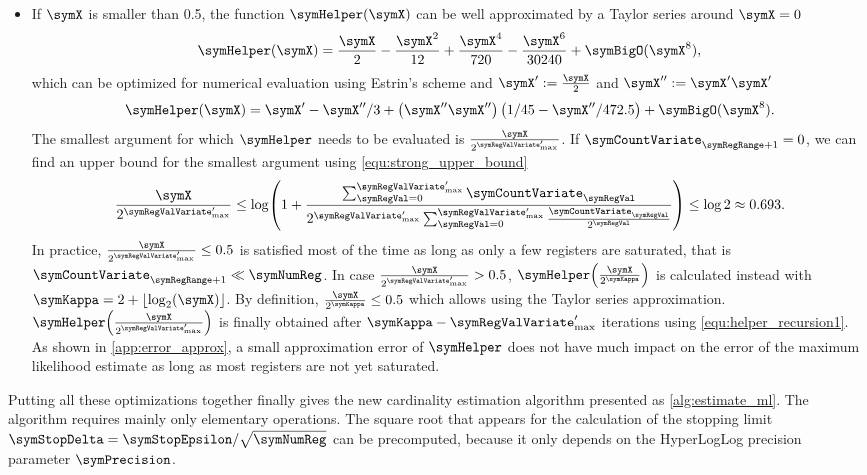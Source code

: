\documentclass[a4paper]{scrartcl}
\begin{document}
\begin{itemize}
\item If $\symX$ is smaller than 0.5, the function $\symHelper(\symX)$ can be well approximated by a Taylor series around $\symX=0$
\begin{equation}
\symHelper(\symX)
=
\frac{\symX}{2} - \frac{\symX^2}{12} +\frac{\symX^4}{720}-\frac{\symX^6}{30240} + \symBigO(\symX^{8}),
\end{equation}
which can be optimized for numerical evaluation using Estrin's scheme and $\symX' := \frac{\symX}{2}$ and $\symX'' := \symX' \symX'$
\begin{equation}
\label{equ:taylor}
\symHelper(\symX)
=
\symX' - \symX''/3 + \left(\symX'' \symX''\right)\left(1/45-\symX''/472.5\right)
+ \symBigO(\symX^{8}).
\end{equation}
The smallest argument for which $\symHelper$ needs to be evaluated is $\frac{\symX}{2^{\symRegValVariate'_\text{max}}}$. If 
$\symCountVariate_{\symRegRange+1}=0$, we can find an upper bound for the smallest argument using \eqref{equ:strong_upper_bound}
\begin{equation}
\frac{\symX}{2^{\symRegValVariate'_\text{max}}} 
\leq
\log\!\left(
1+
\frac{\sum_{\symRegVal=0}^{\symRegValVariate'_\text{max}}\symCountVariate_\symRegVal}
{
2^{\symRegValVariate'_\text{max}}
\sum_{\symRegVal=0}^{\symRegValVariate'_\text{max}}
\frac{\symCountVariate_\symRegVal}{2^\symRegVal}
}
\right)
\leq \log 2 \approx 0.693.
\end{equation}
In practice, $\frac{\symX}{2^{\symRegValVariate'_\text{max}}}\leq0.5$ is satisfied most of the time as long as only a few registers are saturated, that is $\symCountVariate_{\symRegRange+1}\ll \symNumReg$. In case $\frac{\symX}{2^{\symRegValVariate'_\text{max}}} > 0.5$, $\symHelper\!\left(\frac{\symX}{2^{\symKappa}}\right)$ is calculated instead with $\symKappa = 2+\lfloor\log_2(\symX)\rfloor$. By definition, $\frac{\symX}{2^{\symKappa}}\leq 0.5$ which allows using the Taylor series approximation. $\symHelper\!\left(\frac{\symX}{2^{\symRegValVariate'_\text{max}}}\right)$ is finally obtained after $\symKappa -\symRegValVariate'_\text{max}$ iterations using \eqref{equ:helper_recursion1}. As shown in \cref{app:error_approx}, a small approximation error of $\symHelper$ does not have much impact on the error of the maximum likelihood estimate as long as most registers are not yet saturated.
\end{itemize}

Putting all these optimizations together finally gives the new cardinality estimation algorithm presented as \cref{alg:estimate_ml}. The algorithm requires mainly only elementary operations. The square root that appears for the calculation of the stopping limit $\symStopDelta=\symStopEpsilon/\sqrt{\symNumReg}$ can be precomputed, because it only depends on the HyperLogLog precision parameter $\symPrecision$. 
\end{document}
